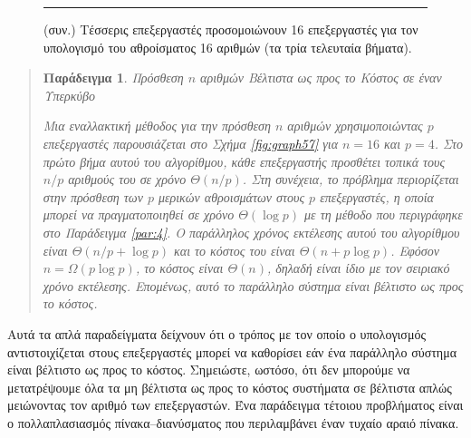 \documentclass[12pt,a4paper]{article} %
\newtheorem{paradeigma}{Παράδειγμα}
\begin{document}
\begin{figure}[H]
\noindent\rule{\textwidth}{0.2pt}
\caption{(συν.) Τέσσερις επεξεργαστές προσομοιώνουν 16 επεξεργαστές για τον 
υπολογισμό του αθροίσματος 16 αριθμών (τα τρία τελευταία βήματα).}
\label{fig:graph56-cont}
\end{figure}
\vspace{0.3cm}

\begin{quote}
\begin{paradeigma} \label{par:8} Πρόσθεση $n$ αριθμών Βέλτιστα ως προς το 
Κόστος σε έναν Υπερκύβο

Μια εναλλακτική μέθοδος για την πρόσθεση $n$ αριθμών χρησιμοποιώντας $p$ 
επεξεργαστές παρουσιάζεται στο Σχήμα \ref{fig:graph57} για $n=16$ και 
$p=4$. Στο πρώτο βήμα αυτού του αλγορίθμου, κάθε επεξεργαστής προσθέτει 
τοπικά τους $n/p$ αριθμούς του σε χρόνο $\Theta(n/p)$. Στη συνέχεια, το 
πρόβλημα περιορίζεται στην πρόσθεση των $p$ μερικών αθροισμάτων στους $p$ 
επεξεργαστές, η οποία μπορεί να πραγματοποιηθεί σε χρόνο $\Theta(\log p)$ 
με τη μέθοδο που περιγράφηκε στο Παράδειγμα \ref{par:4}. Ο παράλληλος 
χρόνος εκτέλεσης αυτού του αλγορίθμου είναι $\Theta(n/p+\log p)$ και το 
κόστος του είναι $\Theta(n+p\log p)$. Εφόσον $n=\Omega(p\log p)$, το κόστος 
είναι $\Theta(n)$, δηλαδή είναι ίδιο με τον σειριακό χρόνο εκτέλεσης. 
Επομένως, αυτό το παράλληλο σύστημα είναι βέλτιστο ως προς το κόστος.
\end{paradeigma}
\end{quote}

Αυτά τα απλά παραδείγματα δείχνουν ότι ο τρόπος με τον οποίο ο υπολογισμός 
αντιστοιχίζεται στους επεξεργαστές μπορεί να καθορίσει εάν ένα παράλληλο 
σύστημα είναι βέλτιστο ως προς το κόστος. Σημειώστε, ωστόσο, ότι δεν 
μπορούμε να μετατρέψουμε όλα τα μη βέλτιστα ως προς το κόστος συστήματα σε 
βέλτιστα απλώς μειώνοντας τον αριθμό των επεξεργαστών. Ένα παράδειγμα 
τέτοιου προβλήματος είναι ο πολλαπλασιασμός πίνακα–διανύσματος που 
περιλαμβάνει έναν τυχαίο αραιό πίνακα. 
\end{document}
